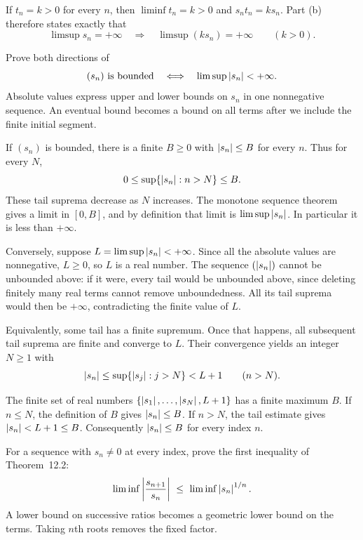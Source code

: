 If $t_n=k>0$ for every $n$, then $\liminf t_n=k>0$ and
$s_nt_n=ks_n$. Part (b) therefore states exactly that
\[
 \limsup s_n=+\infty\quad\Longrightarrow\quad
 \limsup(ks_n)=+\infty\qquad(k>0).
\]

\goal Prove both directions of
\[
 (s_n)\text{ is bounded}\quad\Longleftrightarrow\quad
 \limsup\left|s_n\right|<+\infty.
\]
\idea Absolute values express upper and lower bounds on $s_n$ in one
nonnegative sequence. An eventual bound becomes a bound on all terms
after we include the finite initial segment.

If $(s_n)$ is bounded, there is a finite $B\ge0$ with
$\left|s_n\right|\le B$ for every $n$. Thus for every $N$,
\[
 0\le\sup\{\left|s_n\right|:n>N\}\le B.
\]
These tail suprema decrease as $N$ increases. The monotone sequence
theorem gives a limit in $[0,B]$, and by definition that limit is
$\limsup\left|s_n\right|$. In particular it is less than $+\infty$.

Conversely, suppose $L=\limsup\left|s_n\right|<+\infty$. Since all the
absolute values are nonnegative, $L\ge0$, so $L$ is a real number.
The sequence $(\left|s_n\right|)$ cannot be unbounded above: if it were,
every tail would be unbounded above, since deleting finitely many
real terms cannot remove unboundedness. All its tail suprema would
then be $+\infty$, contradicting the finite value of $L$.

Equivalently, some tail has a finite supremum. Once that happens,
all subsequent tail suprema are finite and converge to $L$.
Their convergence yields an integer $N\ge1$ with
\[
 \left|s_n\right|\le\sup\{\left|s_j\right|:j>N\}<L+1
 \qquad(n>N).
\]

The finite set of real numbers
$\{\left|s_1\right|,\ldots,\left|s_N\right|,L+1\}$ has a finite maximum $B$.
If $n\le N$, the definition of $B$ gives $\left|s_n\right|\le B$.
If $n>N$, the tail estimate gives $\left|s_n\right|<L+1\le B$.
Consequently $\left|s_n\right|\le B$ for every index $n$.

\goal For a sequence with $s_n\ne0$ at every index, prove the first
inequality of Theorem~12.2:
\[
 \liminf\left|\frac{s_{n+1}}{s_n}\right|
 \ \le\ \liminf\left|s_n\right|^{1/n}.
\]
\idea A lower bound on successive ratios becomes a geometric lower
bound on the terms. Taking $n$th roots removes the fixed factor.

